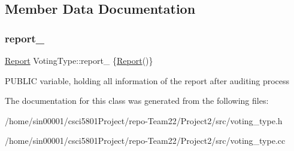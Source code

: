 \subsection{Member Data Documentation}
\mbox{\label{classVotingType_ae1e98bd725c232d76dff9ed44eb0743c}} 
\subsubsection{\texorpdfstring{report\+\_\+}{report\_}}
{\footnotesize\ttfamily \hyperlink{classReport}{Report} Voting\+Type\+::report\+\_\+ \{\hyperlink{classReport}{Report}()\}}

P\+U\+B\+L\+IC variable, holding all information of the report after auditing process 

The documentation for this class was generated from the following files\+:\begin{DoxyCompactItemize}
\item 
/home/sin00001/csci5801\+Project/repo-\/\+Team22/\+Project2/src/voting\+\_\+type.\+h\item 
/home/sin00001/csci5801\+Project/repo-\/\+Team22/\+Project2/src/voting\+\_\+type.\+cc\end{DoxyCompactItemize}
